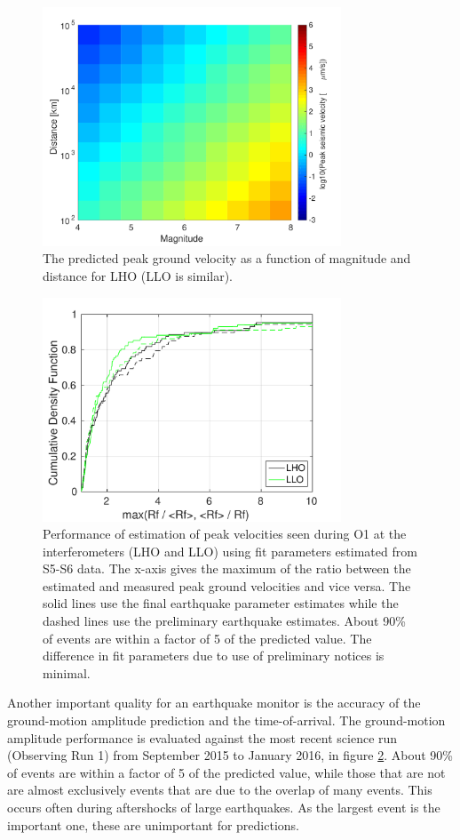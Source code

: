 \documentclass[twocolumn, aps, superscriptaddress]{revtex4}
\begin{document}
\begin{figure}[t]
\hspace*{-0.5cm}
 \includegraphics[width=3.5in]{LHO_M_r.pdf}
 \caption{The predicted peak ground velocity as a function of magnitude and distance for LHO (LLO is similar).}
 \label{fig:MvsR}
\end{figure}

\begin{figure}[t]
\hspace*{-0.5cm}
 \includegraphics[width=3.5in]{initial_final_vs_real.pdf}
 \caption{Performance of estimation of peak velocities seen during O1 at the interferometers (LHO and LLO) using fit parameters estimated from S5-S6 data. The x-axis gives the maximum of the ratio between the estimated and measured peak ground velocities and vice versa. The solid lines use the final earthquake parameter estimates while the dashed lines use the preliminary earthquake estimates. About 90\% of events are within a factor of 5 of the predicted value. The difference in fit parameters due to use of preliminary notices is minimal.}
 \label{fig:regressionperf}
\end{figure}

Another important quality for an earthquake monitor is the accuracy of the ground-motion amplitude prediction and the time-of-arrival.
The ground-motion amplitude performance is evaluated against the most recent science run (Observing Run 1) from September 2015 to January 2016, in figure \ref{fig:regressionperf}. About 90\% of events are within a factor of 5 of the predicted value, while those that are not are almost exclusively events that are due to the overlap of many events. This occurs often during aftershocks of large earthquakes. As the largest event is the important one, these are unimportant for predictions. 
\end{document}
